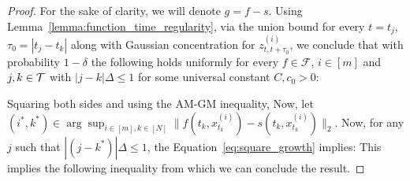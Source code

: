 \ltwolinfinityerrorboundtimeregularity*
\begin{proof}

For the sake of clarity, we will denote $g = f - s$. Using Lemma~\ref{lemma:function_time_regularity}, via the union bound for every $t = t_j$, $\tau_0 = |t_{j}-t_{k}|$ along with Gaussian concentration for $z_{t,t+\tau_0}^{(i)}$, we conclude that with probability $1-\delta$ the following holds uniformly for every $f \in \mathcal{F}$, $i \in [m]$ and $j,k \in \mathcal{T}$ with $ |j-k|\Delta \leq 1$ for some universal constant $C,c_0 > 0$: 
    

    Squaring both sides and using the AM-GM inequality,
Now, let $(i^{*},k^{*}) \in \arg\sup_{i\in [m],k\in[N]}\|f(t_k,x_{t_k}^{(i)})-s(t_k,x_{t_k}^{(i)})\|_2$. Now, for any $j$ such that $|(j-k^*)|\Delta \leq 1$, the Equation~\eqref{eq:square_growth} implies:
This implies the following inequality from which we can conclude the result. 
\end{proof}

